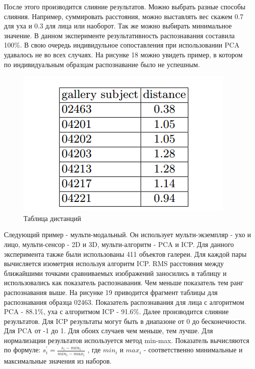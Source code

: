 \documentclass[12pt,a4paper]{article}					%
\begin{document}
После этого производится слияние результатов.
Можно выбрать разные способы слияния.
Например, суммировать расстояния, можно выставлять вес скажем 0.7 для уха и 0.3 для лица или наоборот. 
Так же можно выбирать минимальное значение.
В данном эксперименте результативность распознавания составила 100\%.
В свою очередь индивидульное сопоставления при использовании PCA удавалось не во всех случаях.
На рисунке 18 можно увидеть пример, в котором по индивидуальным образцам распознавание было не успешным.

\begin{figure}[h!]
\centering
\includegraphics[scale=0.60]{res/distances_table_2}
\caption{Таблица дистанций}
\end{figure}

Следующий пример - мульти-модальный.
Он использует мульти-экземпляр - ухо и лицо, мульти-сенсор - 2D и 3D, мульти-алгоритм - PCA и ICP.
Для данного эксперимента также были использованы 411 объектов галереи.
Для каждой пары вычисляется изометрия используя алгоритм ICP.
RMS расстояния между ближайшими точками сравниваемых изображений заносились в таблицу и использовались как показатель распознавания.
Чем меньше показатель тем ранг распознавания выше.
На рисунке 19 приводится фрагмент таблицы для распознавания образца 02463.
Показатель распознавания для лица с алгоритмом PCA - 88.1\%, уха с алгоритмом ICP - 91.6\%.
Далее производится слияние результатов.
Для ICP результаты могут быть в диапазоне от 0 до бесконечности.
Для PCA от -1 до 1.
Для обоих случаев чем меньше, тем лучше.
Для нормализации результатов используется метод min-max.
Показатель вычисляются по формуле:
$s_i^\prime = \frac{s_i - min_i}{min_i - max_i}$
, где $min_i$ и $max_i$ - соответственно минимальные и максимальные значения из наборов.
\end{document}
